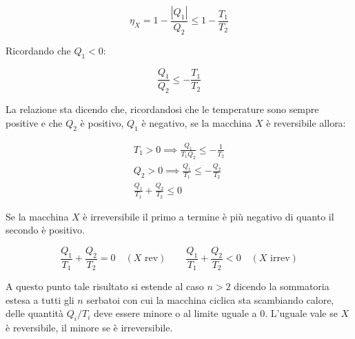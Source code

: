 \[
	\eta_X = 1 - \frac{|Q_1|}{Q_2 } \le 1 - \frac{T_1 }{T_2 }
\]

Ricordando che $Q_1<0$:

\[
	\frac{Q_1 }{Q_2 } \le - \frac{T_1 }{T_2 }
\]

La relazione sta dicendo che, ricordandosi che le temperature sono sempre positive e che $Q_2$ è positivo, $Q_1$ è negativo, se la macchina $X$ è reversibile allora:

\begin{gather*}
	T_1>0 \implies \frac{Q_1 }{T_1 Q_2} \le - \frac{1}{T_2} \\
	Q_2>0 \implies \frac{Q_1 }{T_1 } \le - \frac{Q_2 }{T_2 } \\
	\frac{Q_1 }{T_1} + \frac{Q_2 }{T_2 } \le 0
\end{gather*}

Se la macchina $X$ è irreversibile il primo a termine è più negativo di quanto il secondo è positivo.

\[
	\frac{Q_1 }{T_1} + \frac{Q_2 }{T_2 } = 0 \quad (X\text{ rev} ) \qquad \frac{Q_1 }{T_1} + \frac{Q_2 }{T_2 } < 0 \quad (X\text{ irrev} )
\]

A questo punto tale risultato si estende al caso $n>2$ dicendo la sommatoria estesa a tutti gli $n$ serbatoi con cui la macchina ciclica sta scambiando calore, delle quantità $Q_i/T_i$ deve essere minore o al limite uguale a $0$. L'uguale vale se $X$ è reversibile, il minore se è irreversibile.

